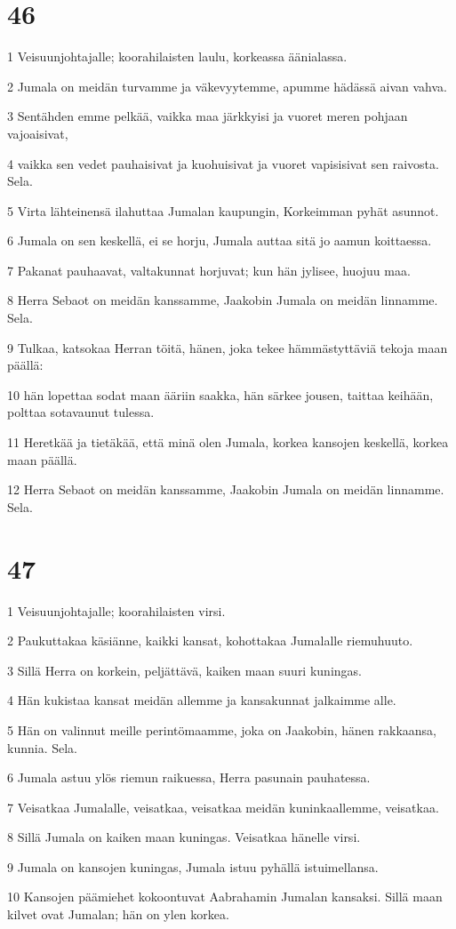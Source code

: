 \chapter{46}

\par 1 Veisuunjohtajalle; koorahilaisten laulu, korkeassa äänialassa.
\par 2 Jumala on meidän turvamme ja väkevyytemme, apumme hädässä aivan vahva.
\par 3 Sentähden emme pelkää, vaikka maa järkkyisi ja vuoret meren pohjaan vajoaisivat,
\par 4 vaikka sen vedet pauhaisivat ja kuohuisivat ja vuoret vapisisivat sen raivosta. Sela.
\par 5 Virta lähteinensä ilahuttaa Jumalan kaupungin, Korkeimman pyhät asunnot.
\par 6 Jumala on sen keskellä, ei se horju, Jumala auttaa sitä jo aamun koittaessa.
\par 7 Pakanat pauhaavat, valtakunnat horjuvat; kun hän jylisee, huojuu maa.
\par 8 Herra Sebaot on meidän kanssamme, Jaakobin Jumala on meidän linnamme. Sela.
\par 9 Tulkaa, katsokaa Herran töitä, hänen, joka tekee hämmästyttäviä tekoja maan päällä:
\par 10 hän lopettaa sodat maan ääriin saakka, hän särkee jousen, taittaa keihään, polttaa sotavaunut tulessa.
\par 11 Heretkää ja tietäkää, että minä olen Jumala, korkea kansojen keskellä, korkea maan päällä.
\par 12 Herra Sebaot on meidän kanssamme, Jaakobin Jumala on meidän linnamme. Sela.

\chapter{47}

\par 1 Veisuunjohtajalle; koorahilaisten virsi.
\par 2 Paukuttakaa käsiänne, kaikki kansat, kohottakaa Jumalalle riemuhuuto.
\par 3 Sillä Herra on korkein, peljättävä, kaiken maan suuri kuningas.
\par 4 Hän kukistaa kansat meidän allemme ja kansakunnat jalkaimme alle.
\par 5 Hän on valinnut meille perintömaamme, joka on Jaakobin, hänen rakkaansa, kunnia. Sela.
\par 6 Jumala astuu ylös riemun raikuessa, Herra pasunain pauhatessa.
\par 7 Veisatkaa Jumalalle, veisatkaa, veisatkaa meidän kuninkaallemme, veisatkaa.
\par 8 Sillä Jumala on kaiken maan kuningas. Veisatkaa hänelle virsi.
\par 9 Jumala on kansojen kuningas, Jumala istuu pyhällä istuimellansa.
\par 10 Kansojen päämiehet kokoontuvat Aabrahamin Jumalan kansaksi. Sillä maan kilvet ovat Jumalan; hän on ylen korkea.

